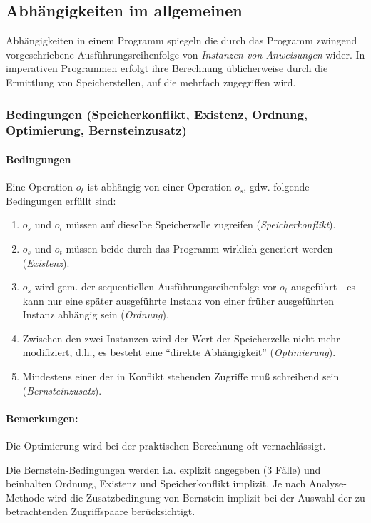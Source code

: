 \subsection{Abhängigkeiten im allgemeinen}

Abhängigkeiten in einem Programm spiegeln die durch das Programm
zwingend vorgeschriebene Ausführungsreihenfolge von \emph{Instanzen von
Anweisungen} wider. In imperativen Programmen erfolgt ihre Berechnung
üblicherweise durch die Ermittlung von Speicherstellen, auf die mehrfach
zugegriffen wird. 

\subsubsection{Bedingungen (Speicherkonflikt, Existenz, Ordnung, Optimierung, Bernsteinzusatz)}
\paragraph{Bedingungen}

Eine Operation $o_t$ ist abhängig von einer Operation $o_s$, gdw.
folgende Bedingungen erfüllt sind:
\begin{enumerate}
\item $o_s$ und $o_t$ müssen auf dieselbe
  Speicherzelle zugreifen (\emph{Speicherkonflikt}).
\item $o_s$ und $o_t$ müssen beide durch
  das Programm wirklich generiert werden (\emph{Existenz}).
\item $o_s$ wird gem. der sequentiellen Ausführungsreihenfolge vor $o_t$ 
  ausgeführt---es kann nur eine später ausgeführte Instanz von einer früher
  ausgeführten Instanz abhängig sein (\emph{Ordnung}).
\item Zwischen den zwei Instanzen wird der Wert der Speicherzelle nicht
  mehr modifiziert, d.h., es besteht eine ``direkte Abhängigkeit''
  (\emph{Optimierung}).
\item Mindestens einer der in Konflikt stehenden Zugriffe muß schreibend
  sein (\emph{Bernsteinzusatz}).
\end{enumerate}

\paragraph{Bemerkungen:} Die Optimierung wird bei der praktischen
Berechnung oft vernachlässigt. 

Die Bernstein-Bedingungen werden i.a. explizit angegeben (3 Fälle) und
beinhalten Ordnung, Existenz und Speicherkonflikt implizit. Je nach
Analyse-Methode wird die Zusatzbedingung von Bernstein implizit bei der
Auswahl der zu betrachtenden Zugriffspaare berücksichtigt.


